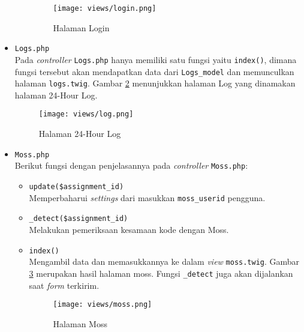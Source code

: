 \begin{itemize}
\begin{itemize}
                        \begin{figure}[H]
                              \centering
                              \texttt{[image: views/login.png]}
                              \caption{Halaman Login}
                              \label{fig:3:1:1:login}
                        \end{figure}

            \end{itemize}

      \item \verb|Logs.php| \\
            Pada \textit{controller} \verb|Logs.php| hanya memiliki satu fungsi yaitu \verb|index()|, dimana fungsi tersebut akan mendapatkan data dari \verb|Logs_model| dan memunculkan halaman \verb|logs.twig|. Gambar \ref{fig:3:1:1:log} menunjukkan halaman Log yang dinamakan halaman 24-Hour Log.

            \begin{figure}[H]
                  \centering
                  \texttt{[image: views/log.png]}
                  \caption{Halaman 24-Hour Log}
                  \label{fig:3:1:1:log}
            \end{figure}


      \item \verb|Moss.php| \\
            Berikut fungsi dengan penjelasannya pada \textit{controller} \verb|Moss.php|:

            \begin{itemize}
                  \item \verb|update($assignment_id)| \\
                        Memperbaharui \textit{settings} dari masukkan \verb|moss_userid| pengguna.
                  \item \verb|_detect($assignment_id)| \\
                        Melakukan pemeriksaan kesamaan kode dengan Moss.
                  \item \verb|index()| \\
                        Mengambil data dan memasukkannya ke dalam \textit{view} \verb|moss.twig|. Gambar \ref{fig:3:1:1:moss} merupakan hasil halaman moss. Fungsi \verb|_detect| juga akan dijalankan saat \textit{form} terkirim.

                        \begin{figure}[H]
                              \centering
                              \texttt{[image: views/moss.png]}
                              \caption{Halaman Moss}
                              \label{fig:3:1:1:moss}
                        \end{figure}


\end{itemize}
\end{itemize}
